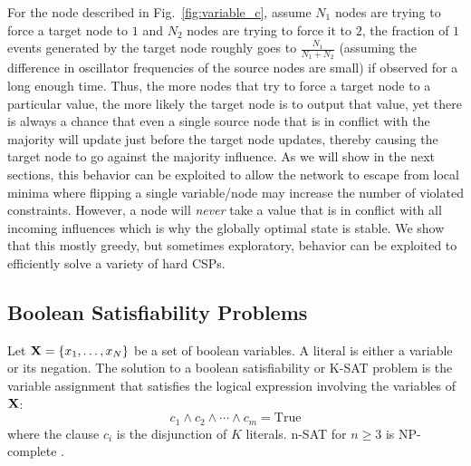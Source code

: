 \documentclass[10pt]{article}
\begin{document}
For the node described in Fig.~\ref{fig:variable_c}, assume $N_1$ nodes are trying to force a target node to $1$ and $N_2$ nodes are trying to force it to $2$, the fraction of $1$ events generated by the target node roughly goes to $\frac{N_1}{N_1+N_2}$ (assuming the difference in oscillator frequencies of the source nodes are small) if observed for a long enough time. Thus, the more nodes that try to force a target node to a particular value, the more likely the target node is to output that value, yet there is always a chance that even a single source node that is in conflict with the majority will update just before the target node updates, thereby causing the target node to go against the majority influence. As we will show in the next sections, this behavior can be exploited to allow the network to escape from local minima where flipping a single variable/node may increase the number of violated constraints. However, a node will {\it never} take a value that is in conflict with all incoming influences which is why the globally optimal state is stable. We show that this mostly greedy, but sometimes exploratory, behavior can be exploited to efficiently solve a variety of hard CSPs. 


\subsection*{Boolean Satisfiability Problems}
\label{sec:bool}
Let ${\bf X} = \{x_1,\ldots,x_N\}$ be a set of boolean variables. A literal is either a variable or its negation. The solution to a boolean satisfiability or K-SAT problem is the variable assignment that satisfies the logical expression involving the variables of ${\bf X}$:
$$c_1 \wedge c_2 \wedge \cdots \wedge c_m = \text{True}$$
where the clause $c_i$ is the disjunction of $K$ literals. n-SAT for $n \geq 3$ is NP-complete \cite{Sipser96}. 
\end{document}
